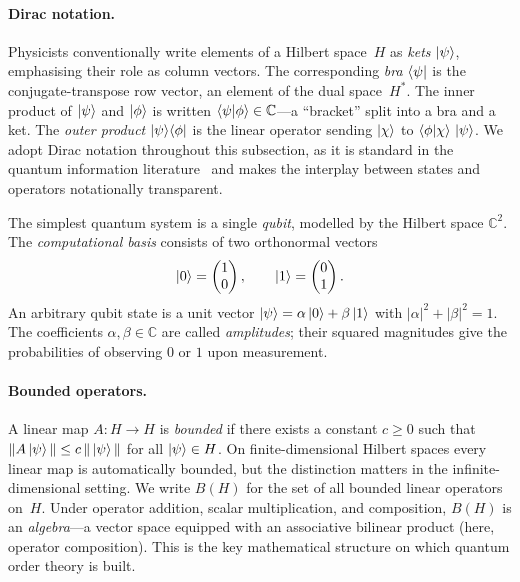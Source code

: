 \paragraph{Dirac notation.}
Physicists conventionally write elements of a Hilbert space~$H$ as
\emph{kets} $\ket{\psi}$, emphasising their role as column vectors.
The corresponding \emph{bra} $\bra{\psi}$ is the conjugate-transpose
row vector, an element of the dual space~$H^*$.
The inner product of $\ket{\psi}$ and $\ket{\phi}$ is written
$\braket{\psi|\phi} \in \mathbb{C}$---a ``bracket'' split into a
bra and a ket.
The \emph{outer product} $\ket{\psi}\!\bra{\phi}$ is the linear
operator sending $\ket{\chi}$ to
$\braket{\phi|\chi}\,\ket{\psi}$.
We adopt Dirac notation throughout this subsection, as it is standard
in the quantum information
literature~\cite{NielsenChuang2010} and makes the interplay between
states and operators notationally transparent.

\begin{example}
\label{ex:qubit-hilbert}
The simplest quantum system is a single \emph{qubit}, modelled by the
Hilbert space $\mathbb{C}^2$.
The \emph{computational basis} consists of two orthonormal vectors
\[
  \ket{0} = \begin{pmatrix} 1 \\ 0 \end{pmatrix}, \qquad
  \ket{1} = \begin{pmatrix} 0 \\ 1 \end{pmatrix}.
\]
An arbitrary qubit state is a unit vector
$\ket{\psi} = \alpha\ket{0} + \beta\ket{1}$ with
$|\alpha|^2 + |\beta|^2 = 1$.
The coefficients $\alpha, \beta \in \mathbb{C}$ are called
\emph{amplitudes}; their squared magnitudes give the probabilities
of observing $0$ or $1$ upon measurement.
\end{example}

\paragraph{Bounded operators.}
A linear map $A : H \to H$ is \emph{bounded} if there exists a
constant $c \geq 0$ such that
$\|A\ket{\psi}\| \leq c\,\|\ket{\psi}\|$ for
all $\ket{\psi} \in H$.
On finite-dimensional Hilbert spaces every linear map is automatically
bounded, but the distinction matters in the infinite-dimensional
setting.
We write $B(H)$ for the set of all bounded linear operators on~$H$.
Under operator addition, scalar multiplication, and composition,
$B(H)$ is an \emph{algebra}---a vector space equipped with an
associative bilinear product (here, operator
composition). This is the key mathematical structure on which
quantum order theory is built.

